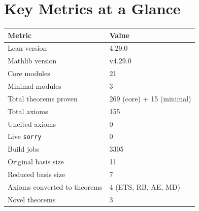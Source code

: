 \documentclass[preprints,article,accept,pdftex,oneauthor]{Definitions/mdpi}
\begin{document}

\maketitle

\newpage
\tableofcontents
\newpage

\section*{Key Metrics at a Glance}

\begin{center}
\begin{tabular}{ll}
\toprule
Metric & Value \\
\midrule
Lean version & 4.29.0 \\
Mathlib version & v4.29.0 \\
Core modules & 21 \\
Minimal modules & 3 \\
Total theorems proven & 269 (core) + 15 (minimal) \\
Total axioms & 155 \\
Uncited axioms & 0 \\
Live \texttt{sorry} & 0 \\
Build jobs & 3305 \\
Original basis size & 11 \\
Reduced basis size & 7 \\
Axioms converted to theorems & 4 (ETS, RB, AE, MD) \\
Novel theorems & 3 \\
\bottomrule
\end{tabular}
\end{center}

\newpage


\newpage

\newpage

\newpage

\newpage

\newpage

\newpage

\newpage


\newpage
\appendix

\newpage

\newpage

\newpage

\newpage

\newpage


\end{document}
